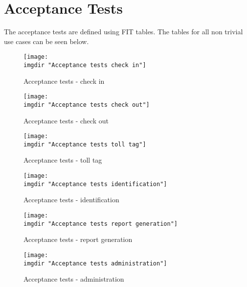 \chapter{Acceptance Tests}
The acceptance tests are defined using FIT tables. The tables for all non trivial use cases can be seen below.

\begin{figure}
\texttt{[image: \\imgdir "Acceptance tests check in"]}
\centering
\caption{Acceptance tests - check in}
\label{fig:acceptance_tests_check_in}
\end{figure}

\begin{figure}
\texttt{[image: \\imgdir "Acceptance tests check out"]}
\centering
\caption{Acceptance tests - check out}
\label{fig:acceptance_tests_check_out}
\end{figure}

\begin{figure}
\texttt{[image: \\imgdir "Acceptance tests toll tag"]}
\centering
\caption{Acceptance tests - toll tag}
\label{fig:acceptance_tests_toll_tag}
\end{figure}

\begin{figure}
\texttt{[image: \\imgdir "Acceptance tests identification"]}
\centering
\caption{Acceptance tests - identification}
\label{fig:acceptance_tests_identification}
\end{figure}

\begin{figure}
\texttt{[image: \\imgdir "Acceptance tests report generation"]}
\centering
\caption{Acceptance tests - report generation}
\label{fig:acceptance_tests_report_generation}
\end{figure}

\begin{figure}
\texttt{[image: \\imgdir "Acceptance tests administration"]}
\centering
\caption{Acceptance tests - administration}
\label{fig:acceptance_tests_administration}
\end{figure}
